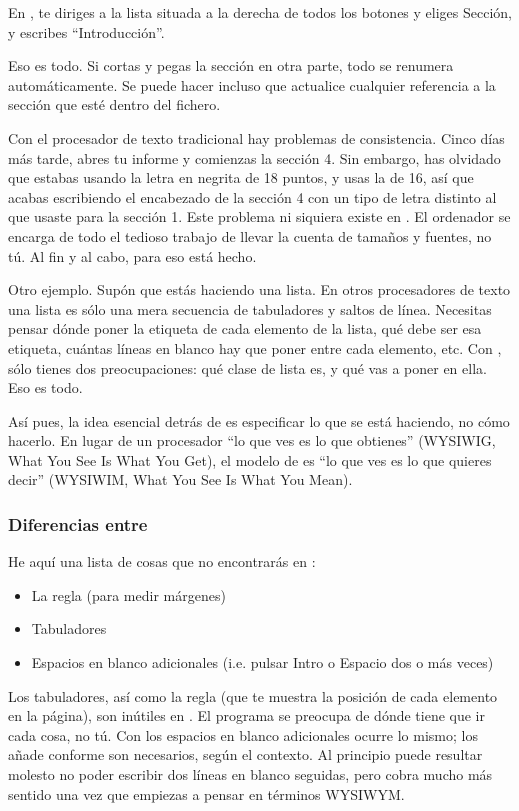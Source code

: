 En \LyX{}, te diriges a la lista situada a la derecha de todos los
botones y eliges \textsf{Sección}, y escribes {}``Introducción''.

Eso es todo. Si cortas y pegas la sección en otra parte, todo se renumera
automáticamente. Se puede hacer incluso que \LyX{} actualice cualquier
referencia a la sección que esté dentro del fichero.

Con el procesador de texto tradicional hay problemas de consistencia.
Cinco días más tarde, abres tu informe y comienzas la sección 4. Sin
embargo, has olvidado que estabas usando la letra en negrita de 18
puntos, y usas la de 16, así que acabas escribiendo el encabezado
de la sección 4 con un tipo de letra distinto al que usaste para la
sección 1. Este problema ni siquiera existe en \LyX{}. El ordenador
se encarga de todo el tedioso trabajo de llevar la cuenta de tamaños
y fuentes, no tú. Al fin y al cabo, para eso está hecho.

Otro ejemplo. Supón que estás haciendo una lista. En otros procesadores
de texto una lista es sólo una mera secuencia de tabuladores y saltos
de línea. Necesitas pensar dónde poner la etiqueta de cada elemento
de la lista, qué debe ser esa etiqueta, cuántas líneas en blanco hay
que poner entre cada elemento, etc. Con \LyX{}, sólo tienes dos preocupaciones:
qué clase de lista es, y qué vas a poner en ella. Eso es todo.

Así pues, la idea esencial detrás de \LyX{} es especificar lo que
se está haciendo, no cómo hacerlo. En lugar de un procesador {}``lo
que ves es lo que obtienes'' (WYSIWIG, What You See Is What You Get),
el modelo de \LyX{} es {}``lo que ves es lo que quieres decir''
(WYSIWIM, What You See Is What You Mean).


\subsubsection{Diferencias entre \LyX{}}

He aquí una lista de cosas que no encontrarás en \LyX{}:

\begin{itemize}
\item La regla (para medir márgenes)
\item Tabuladores
\item Espacios en blanco adicionales (i.e. pulsar \textsf{Intro} o \textsf{Espacio}
dos o más veces)
\end{itemize}
Los tabuladores, así como la regla (que te muestra la posición de
cada elemento en la página), son inútiles en \LyX{}. El programa se
preocupa de dónde tiene que ir cada cosa, no tú. Con los espacios
en blanco adicionales ocurre lo mismo; \LyX{} los añade conforme son
necesarios, según el contexto. Al principio puede resultar molesto
no poder escribir dos líneas en blanco seguidas, pero cobra mucho
más sentido una vez que empiezas a pensar en términos WYSIWYM.

